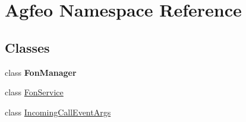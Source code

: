 \hypertarget{namespace_agfeo}{}\section{Agfeo Namespace Reference}
\label{namespace_agfeo}
\subsection*{Classes}
\begin{DoxyCompactItemize}
\item 
class {\bfseries Fon\+Manager}
\item 
class \hyperlink{class_agfeo_1_1_fon_service}{Fon\+Service}
\item 
class \hyperlink{class_agfeo_1_1_incoming_call_event_args}{Incoming\+Call\+Event\+Args}
\end{DoxyCompactItemize}
